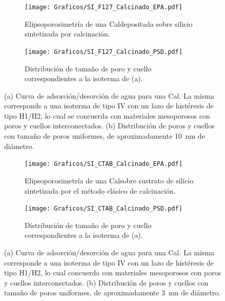 		 		\begin{figure}[!t]
		     	  		\begin{subfigure}[t]{0.495\textwidth}
		     	  		\texttt{[image: Graficos/SI\_F127\_Calcinado\_EPA.pdf]}
						\caption{Elipsoporosimetría de una Cal\pdmF\space depositada sobre silicio sintetizada por calcinación.}
						\label{fig:F127_EPA}
						\end{subfigure}
						\begin{subfigure}[t]{0.495\textwidth}
		     	  		\texttt{[image: Graficos/SI\_F127\_Calcinado\_PSD.pdf]}
						\caption{Distribución de tamaño de poro y cuello correspondientes a la isoterma de (a).}
						\label{fig:F127_PSD}
						\end{subfigure}
						\caption[Elipsoporosimetría para sistemas Cal\pdmF.]{(a) Curva de adsorción/desorción de agua para una Cal\pdmF. La misma corresponde a una isoterma de tipo IV con un lazo de histéresis de tipo H1/H2, lo cual se concuerda con materiales mesoporosos con poros y cuellos interconectados. (b) Distribución de poros y cuellos con tamaño de poros uniformes, de aproximadamente \SI{10}{\nm} de diámetro.}
						\label{fig:F127_epa_psd_cal}
						\end{figure}
					
					\begin{figure}[!t]
		     	  		\begin{subfigure}[t]{0.495\textwidth}
		     	  		\texttt{[image: Graficos/SI\_CTAB\_Calcinado\_EPA.pdf]}
						\caption{Elipsoporosimetría de una Cal\pdmF\space sobre sustrato de silicio sintetizada por el método clásico de calcinación.}
						\label{fig:CTAB_EPA}
						\end{subfigure}
						\begin{subfigure}[t]{0.495\textwidth}
		     	  		\texttt{[image: Graficos/SI\_CTAB\_Calcinado\_PSD.pdf]}
						\caption{Distribución de tamaño de poro y cuello correspondientes a la isoterma de (a).}
						\label{fig:CTAB_PSD}
						\end{subfigure}
						\caption[Elipsoporosimetría para sistemas Cal\pdmC.]{(a) Curva de adsorción/desorción de agua para una Cal\pdmC. La misma corresponde a una isoterma de tipo IV con un lazo de histéresis de tipo H1/H2, lo cual concuerda con materiales mesoporosos con poros y cuellos interconectados. (b) Distribución de poros y cuellos con tamaño de poros uniformes, de aproximadamente \SI{3}{\nm} de diámetro.}
						\end{figure}

